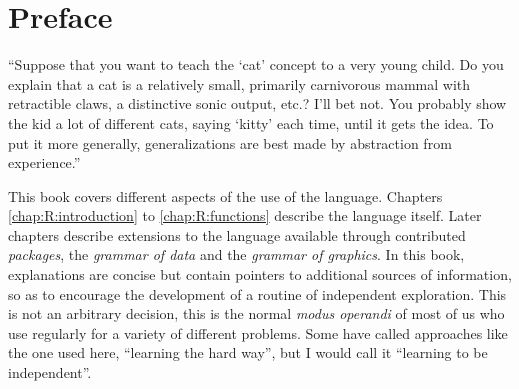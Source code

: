 \chapter*{Preface}

\begin{VF}
``Suppose that you want to teach the `cat' concept to a very young child. Do you explain that a cat is a relatively small, primarily carnivorous mammal with retractible claws, a distinctive sonic output, etc.? I'll bet not. You probably show the kid a lot of different cats, saying `kitty' each time, until it gets the idea. To put it more generally, generalizations are best made by abstraction from experience.''

\end{VF}



\noindent
This book covers different aspects of the use of the \Rlang language. Chapters \ref{chap:R:introduction} to \ref{chap:R:functions} describe the \Rlang language itself. Later chapters describe extensions to the \Rlang language available through contributed \emph{packages}, the \emph{grammar of data} and the \emph{grammar of graphics}. In this book, explanations are concise but contain pointers to additional sources of information, so as to encourage the development of a routine of independent exploration. This is not an arbitrary decision, this is the normal \emph{modus operandi} of most of us who use \Rlang regularly for a variety of different problems. Some have called approaches like the one used here, ``learning the hard way'', but I would call it ``learning to be independent''.

